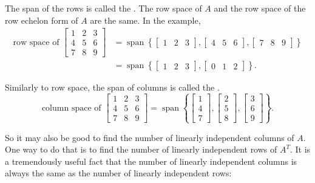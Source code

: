 The span of the rows is called the \emph{}.
The row space of $A$ and the row space of the row echelon form of $A$ are the same.
In the example,
\begin{equation*}
\begin{split}
\text{row space of }
\begin{bmatrix}
1 & 2 & 3 \\
4 & 5 & 6 \\
7 & 8 & 9
\end{bmatrix}
& =
\operatorname{span}
\left\{
\begin{bmatrix}
1 & 2 & 3
\end{bmatrix}
,
\begin{bmatrix}
4 & 5 & 6
\end{bmatrix}
,
\begin{bmatrix}
7 & 8 & 9
\end{bmatrix}
\right\}
\\
& =
\operatorname{span}
\left\{
\begin{bmatrix}
1 & 2 & 3
\end{bmatrix}
,
\begin{bmatrix}
0 & 1 & 2
\end{bmatrix}
\right\} .
\end{split}
\end{equation*}

\medskip

Similarly to row space, the span of columns is called the
\emph{}.
\begin{equation*}
\text{column space of }
\begin{bmatrix}
1 & 2 & 3 \\
4 & 5 & 6 \\
7 & 8 & 9
\end{bmatrix}
=
\operatorname{span}
\left\{
\begin{bmatrix}
1 \\ 4 \\ 7
\end{bmatrix}
,
\begin{bmatrix}
2 \\ 5 \\ 8
\end{bmatrix}
,
\begin{bmatrix}
3 \\ 6 \\ 9
\end{bmatrix}
\right\} .
\end{equation*}

So it may also be good to find the number of linearly independent columns
of $A$.  One way to do that is to find the number of linearly independent
rows of $A^T$.  It is a tremendously useful fact that the number of
linearly independent
columns is always the same as the number of linearly independent rows:

